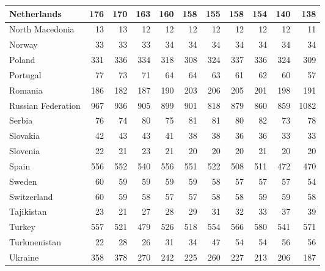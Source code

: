 \begin{table}
\begin{tabular}{|l|r|r|r|r|r|r|r|r|r|r|}
                   Netherlands&    176&    170&    163&    160&    158&    155&    158&    154&    140&    138\\\hline
               North Macedonia&     13&     13&     12&     12&     12&     12&     12&     12&     12&     11\\\hline
                        Norway&     33&     33&     33&     34&     34&     34&     34&     34&     34&     34\\\hline
                        Poland&    331&    336&    334&    318&    308&    324&    337&    336&    324&    309\\\hline
                      Portugal&     77&     73&     71&     64&     64&     63&     61&     62&     60&     57\\\hline
                       Romania&    186&    182&    187&    190&    203&    206&    205&    201&    198&    191\\\hline
            Russian Federation&    967&    936&    905&    899&    901&    818&    879&    860&    859&   1082\\\hline
                        Serbia&     76&     74&     80&     75&     81&     81&     80&     82&     73&     78\\\hline
                      Slovakia&     42&     43&     43&     41&     38&     38&     36&     36&     33&     33\\\hline
                      Slovenia&     22&     21&     23&     21&     20&     20&     20&     21&     20&     20\\\hline
                         Spain&    556&    552&    540&    556&    551&    522&    508&    511&    472&    470\\\hline
                        Sweden&     60&     59&     59&     59&     59&     58&     57&     57&     57&     54\\\hline
                   Switzerland&     60&     59&     58&     57&     57&     58&     58&     59&     59&     58\\\hline
                    Tajikistan&     23&     21&     27&     28&     29&     31&     32&     33&     37&     39\\\hline
                        Turkey&    557&    521&    479&    526&    518&    554&    566&    580&    541&    571\\\hline
                  Turkmenistan&     22&     28&     26&     31&     34&     47&     54&     54&     56&     56\\\hline
                       Ukraine&    358&    378&    270&    242&    225&    260&    227&    213&    206&    187\\\hline

\end{tabular}
\end{table}
